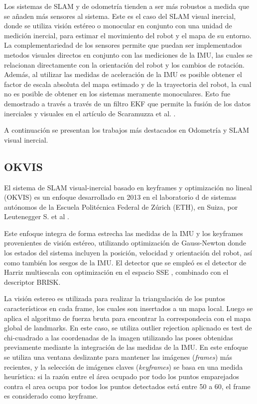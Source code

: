 Los sistemas de SLAM y de odometría tienden a ser más robustos a medida que se añaden más sensores al sistema. Este es el caso del SLAM visual inercial, donde se utiliza visión estéreo o monocular en conjunto con una unidad de medición inercial, para estimar el movimiento del robot y el mapa de su entorno.  La complementariedad de los sensores permite que puedan ser implementados metodos visuales directos en conjunto con las mediciones de la IMU, las cuales se relacionan directamente con la orientación del robot y los cambios de rotación. Además, al utilizar las medidas de aceleración de la IMU es posible obtener el factor de escala absoluta  del mapa estimado y de la trayectoria del robot, la cual no es posible de obtener en los sistemas meramente monoculares. Esto fue demostrado a través a través de un filtro EKF que permite la fusión de los datos inerciales y visuales en el artículo de  Scaramuzza et al. \cite{scaramuzza}.

A continuación se presentan los trabajos más destacados en Odometría y SLAM visual inercial.

\subsection{OKVIS}

El sistema de SLAM visual-inercial basado en keyframes y optimización no lineal (OKVIS)  es un enfoque desarrollado en 2013 en el laboratorio d de sistemas autónomos de la Escuela Politécnica Federal de Zúrich (ETH), en Suiza, por  Leutenegger S. et al \cite{okvis}.


Este enfoque integra de forma estrecha las medidas de la IMU y los keyframes provenientes de visión estéreo, utilizando optimización de Gauss-Newton donde los estados del sistema incluyen la posición, velocidad y orientación del robot, así como también los sesgos de la IMU. El detector que se empleó es el detector de Harriz multiescala con optimización en el espacio SSE , combinado con el descriptor BRISK. 

La visión estereo es utilizada para realizar la triangulación de los puntos característicos en cada frame, los cuales son insertados a un mapa local. Luego se aplica el algoritmo de fuerza bruta para encontrar la correspondecia con el mapa global de landmarks. En este caso, se utiliza outlier rejection aplicnado es test de chi-cuadrado a las coordenadas de la imagen utilizando las poses obtenidas previamente mediante la integración de las medidas de la IMU.
En este enfoque se utiliza una ventana deslizante para mantener las imágenes (\textit{frames}) más recientes, y la selección de imágenes claves (\textit{keyframes}) se basa en una medida heurística: si la razón entre el área ocupado por todo los puntos emparejados contra el area ocupa por todos los puntos detectados está entre 50 a 60, el frame es considerado como keyframe.


